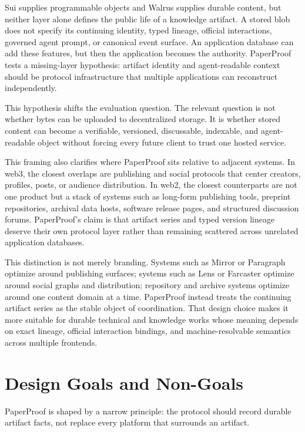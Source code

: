 \documentclass[journal]{IEEEtran}
\begin{document}
Sui supplies programmable objects and Walrus supplies durable content, but neither layer alone defines the public life of a knowledge artifact. A stored blob does not specify its continuing identity, typed lineage, official interactions, governed agent prompt, or canonical event surface. An application database can add these features, but then the application becomes the authority. PaperProof tests a missing-layer hypothesis: artifact identity and agent-readable context should be protocol infrastructure that multiple applications can reconstruct independently.

This hypothesis shifts the evaluation question. The relevant question is not whether bytes can be uploaded to decentralized storage. It is whether stored content can become a verifiable, versioned, discussable, indexable, and agent-readable object without forcing every future client to trust one hosted service.

This framing also clarifies where PaperProof sits relative to adjacent systems.
In web3, the closest overlaps are publishing and social protocols that center
creators, profiles, posts, or audience distribution. In web2, the closest
counterparts are not one product but a stack of systems such as long-form
publishing tools, preprint repositories, archival data hosts, software release
pages, and structured discussion forums. PaperProof's claim is that artifact
series and typed version lineage deserve their own protocol layer rather than
remaining scattered across unrelated application databases.

This distinction is not merely branding. Systems such as Mirror or Paragraph
optimize around publishing surfaces; systems such as Lens or Farcaster optimize
around social graphs and distribution; repository and archive systems optimize
around one content domain at a time. PaperProof instead treats the continuing
artifact series as the stable object of coordination. That design choice makes
it more suitable for durable technical and knowledge works whose meaning depends
on exact lineage, official interaction bindings, and machine-resolvable
semantics across multiple frontends.

\section{Design Goals and Non-Goals}

PaperProof is shaped by a narrow principle: the protocol should record durable artifact facts, not replace every platform that surrounds an artifact.
\end{document}

